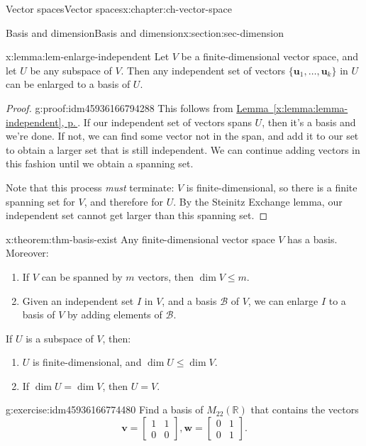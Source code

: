 \documentclass[oneside,10pt,]{book}
\newcommand{\xreffont}{\relax}
\numberwithin{equation}{section}
\newcommand{\bbm}{\begin{bmatrix}}
\newcommand{\ebm}{\end{bmatrix}}
\newcommand{\R}{\mathbb{R}}
\newcommand{\uu}{\mathbf{u}}
\newcommand{\vv}{\mathbf{v}}
\newcommand{\ww}{\mathbf{w}}
\newcommand{\amp}{&}
\begin{document}
\begin{chapterptx}{Vector spaces}{}{Vector spaces}{}{}{x:chapter:ch-vector-space}
\begin{sectionptx}{Basis and dimension}{}{Basis and dimension}{}{}{x:section:sec-dimension}
\begin{lemma}{}{}{x:lemma:lem-enlarge-independent}%
Let \(V\) be a finite-dimensional vector space, and let \(U\) be any subspace of \(V\). Then any independent set of vectors \(\{\uu_1,\ldots, \uu_k\}\) in \(U\) can be enlarged to a basis of \(U\).%
\end{lemma}
\begin{proof}{}{g:proof:idm45936166794288}
This follows from \hyperref[x:lemma:lemma-independent]{Lemma~{\xreffont\ref{x:lemma:lemma-independent}}, p.\,\pageref{x:lemma:lemma-independent}}. If our independent set of vectors spans \(U\), then it's a basis and we're done. If not, we can find some vector not in the span, and add it to our set to obtain a larger set that is still independent. We can continue adding vectors in this fashion until we obtain a spanning set.%
\par
Note that this process \emph{must} terminate: \(V\) is finite-dimensional, so there is a finite spanning set for \(V\), and therefore for \(U\). By the Steinitz Exchange lemma, our independent set cannot get larger than this spanning set.%
\end{proof}
\begin{theorem}{}{}{x:theorem:thm-basis-exist}%
Any finite-dimensional vector space \(V\) has a basis. Moreover:%
\begin{enumerate}
\item{}If \(V\) can be spanned by \(m\) vectors, then \(\dim V\leq m\).%
\item{}Given an independent set \(I\) in \(V\), and a basis \(\mathcal{B}\) of \(V\), we can enlarge \(I\) to a basis of \(V\) by adding elements of \(\mathcal{B}\).%
\end{enumerate}
%
\par
If \(U\) is a subspace of \(V\), then:%
\begin{enumerate}
\item{}\(U\) is finite-dimensional, and \(\dim U\leq \dim V\).%
\item{}If \(\dim U = \dim V\), then \(U=V\).%
\end{enumerate}
%
\end{theorem}
\begin{inlineexercise}{}{g:exercise:idm45936166774480}%
Find a basis of \(M_{22}(\R)\) that contains the vectors%
\begin{equation*}
\vv=\bbm 1\amp 1\\0\amp 0\ebm, \ww=\bbm 0\amp 1\\0\amp 1\ebm\text{.}
\end{equation*}

\end{inlineexercise}
\end{sectionptx}
\end{chapterptx}
\end{document}
